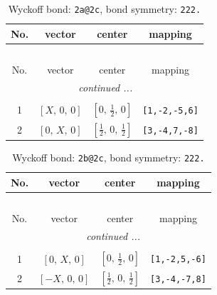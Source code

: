 \documentclass[fleqn,8pt]{jsarticle}
\begin{document}
\begin{longtable}{cccc}
\caption{Wyckoff bond: {\tt 2a@2c}, bond symmetry: {\tt 222.}}
 \\
 \hline \hline
No. & vector & center & mapping \\ \hline \endfirsthead

\multicolumn{3}{l}{\tablename\ \thetable{}} \\
 \hline \hline
No. & vector & center & mapping \\ \hline \endhead

 \hline \hline
\multicolumn{3}{r}{\footnotesize\it continued ...} \\ \endfoot

 \hline \hline
\multicolumn{3}{r}{} \\ \endlastfoot

1 & $\left[ X,\, 0,\, 0 \right]$ & $\left[ 0,\, \frac{1}{2},\, 0 \right]$ & {\tt [1,-2,-5,6]} \\ \hline
2 & $\left[ 0,\, X,\, 0 \right]$ & $\left[ \frac{1}{2},\, 0,\, \frac{1}{2} \right]$ & {\tt [3,-4,7,-8]} \\
\end{longtable}
\renewcommand{\arraystretch}{1.2}
\begin{longtable}{cccc}
\caption{Wyckoff bond: {\tt 2b@2c}, bond symmetry: {\tt 222.}}
 \\
 \hline \hline
No. & vector & center & mapping \\ \hline \endfirsthead

\multicolumn{3}{l}{\tablename\ \thetable{}} \\
 \hline \hline
No. & vector & center & mapping \\ \hline \endhead

 \hline \hline
\multicolumn{3}{r}{\footnotesize\it continued ...} \\ \endfoot

 \hline \hline
\multicolumn{3}{r}{} \\ \endlastfoot

1 & $\left[ 0,\, X,\, 0 \right]$ & $\left[ 0,\, \frac{1}{2},\, 0 \right]$ & {\tt [1,-2,5,-6]} \\ \hline
2 & $\left[ - X,\, 0,\, 0 \right]$ & $\left[ \frac{1}{2},\, 0,\, \frac{1}{2} \right]$ & {\tt [3,-4,-7,8]} \\
\end{longtable}
\renewcommand{\arraystretch}{1.2}
\end{document}
